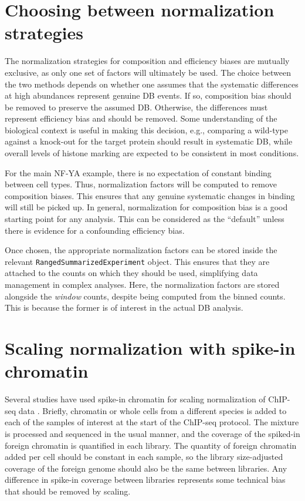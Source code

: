 \documentclass[12pt]{report}
\renewenvironment{Schunk}{\vspace{0pt}}{\vspace{0pt}}
\newcommand{\code}[1]{{\small\texttt{#1}}}
\begin{document}
\section{Choosing between normalization strategies}
The normalization strategies for composition and efficiency biases are mutually exclusive, as only one set of factors will ultimately be used.
The choice between the two methods depends on whether one assumes that the systematic differences at high abundances represent genuine DB events.
If so, composition bias should be removed to preserve the assumed DB.
Otherwise, the differences must represent efficiency bias and should be removed.
Some understanding of the biological context is useful in making this decision, e.g., comparing a wild-type against a knock-out for the target protein should result in systematic DB, while overall levels of histone marking are expected to be consistent in most conditions.

For the main NF-YA example, there is no expectation of constant binding between cell types.
Thus, normalization factors will be computed to remove composition biases.
This ensures that any genuine systematic changes in binding will still be picked up.
In general, normalization for composition bias is a good starting point for any analysis.
This can be considered as the ``default'' unless there is evidence for a confounding efficiency bias.

Once chosen, the appropriate normalization factors can be stored inside the relevant \code{RangedSummarizedExperiment} object.
This ensures that they are attached to the counts on which they should be used, simplifying data management in complex analyses.
Here, the normalization factors are stored alongside the \textit{window} counts, despite being computed from the binned counts.
This is because the former is of interest in the actual DB analysis.

\begin{Schunk}
\end{Schunk}

\section{Scaling normalization with spike-in chromatin}
Several studies have used spike-in chromatin for scaling normalization of ChIP-seq data \citep{bonhoure2014quantifying,orlando2014quantitative}.
Briefly, chromatin or whole cells from a different species is added to each of the samples of interest at the start of the ChIP-seq protocol.
The mixture is processed and sequenced in the usual manner, and the coverage of the spiked-in foreign chromatin is quantified in each library.
The quantity of foreign chromatin added per cell should be constant in each sample, so the library size-adjusted coverage of the foreign genome should also be the same between libraries.
Any difference in spike-in coverage between libraries represents some technical bias that should be removed by scaling.
\end{document}
